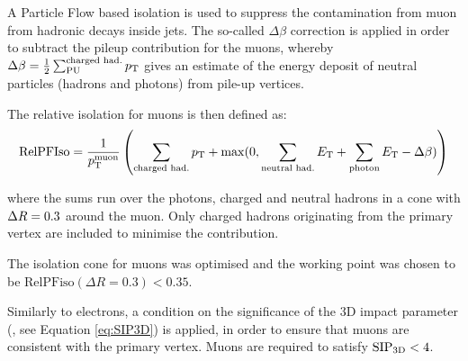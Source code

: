 A Particle Flow based isolation is used to suppress the contamination from muon from hadronic decays inside jets.
The so-called $\Delta\beta$ correction is applied in order to subtract the pileup contribution for the muons, 
whereby $\Delta\beta = \frac{1}{2} \sum^\text{charged had.}_\text{PU} p_{\mathrm{T}}$ gives an estimate of the energy deposit of neutral particles (hadrons and photons) from pile-up vertices.

The relative isolation for muons is then defined as:
\begin{equation}
\text{RelPFIso} = \frac{1}{p_{\mathrm{T}}^\text{muon}} \left( \sum_\text{charged had.} p_{\mathrm{T}} + \max(0, \sum_\text{neutral had.} E_{\mathrm{T}} + \sum_\text{photon} E_{\mathrm{T}} - \Delta \beta) \right)
\label{eqn:mupfiso}
\end{equation}

where the sums run over the photons, charged and neutral hadrons in a cone with $\Delta R = 0.3$ around the muon.
Only charged hadrons originating from the primary vertex are included to minimise the \pileup contribution.

The isolation cone for muons was optimised and the working point was chosen to be $\text{RelPFiso}(\Delta R = 0.3) < 0.35$. 

Similarly to electrons, a condition on the significance of the 3D impact parameter (\SIPthreeD, see Equation \ref{eq:SIP3D}) is applied,
in order to ensure that muons are consistent with the primary vertex.
Muons are required to satisfy $\mathrm{SIP}_{\mathrm{3D}} < 4$.
